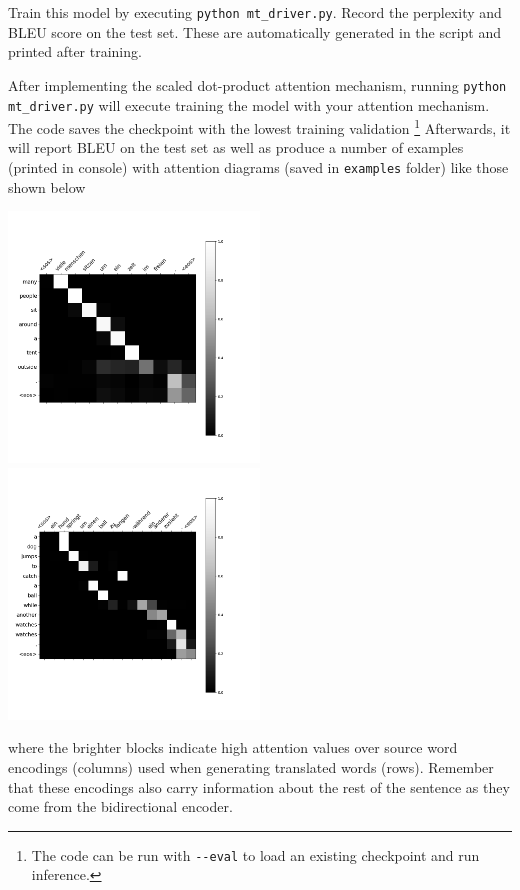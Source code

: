 \documentclass[a4paper,10pt]{article}
\begin{document}
\begin{taskbox}
{\noindent Train this model by executing  \texttt{python mt\_driver.py}. Record the perplexity and BLEU score on the test set. These are automatically generated in the script and printed after training.}
\end{taskbox}
\vspace{5pt}

After implementing the scaled dot-product attention mechanism, running \texttt{python mt\_driver.py} will execute training the model with your attention mechanism. The code saves the checkpoint with the lowest training validation \footnote{The code can be run with \texttt{-{}-eval} to load an existing checkpoint and run inference.} Afterwards, it will report BLEU on the test set as well as produce a number of examples (printed in console) with attention diagrams (saved in \texttt{examples} folder) like those shown below

\includegraphics[width=0.5\textwidth]{figures/ex2.png}
\includegraphics[width=0.5\textwidth]{figures/ex4.png}

\noindent where the brighter blocks indicate high attention values over source word encodings (columns) used when generating translated words (rows). Remember that these encodings also carry information about the rest of the sentence as they come from the bidirectional encoder.
\end{document}
